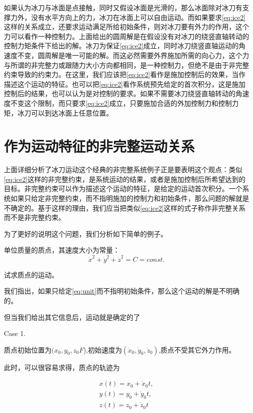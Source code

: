 \documentclass{ctexart}
\begin{document}
如果认为冰刀与冰面是点接触，同时又假设冰面是光滑的，那么冰面除对冰刀有支撑力外，没有水平方向上的力，冰刀在冰面上可以自由运动。而如果要求\eqref{eq:ice2}这样的关系成立，还要求运动满足所给初始条件，则对冰刀要有外力的作用，这个力可以看作一种控制力。上面给出的圆周解是在假设没有对冰刀的绕竖直轴转动的控制力矩条件下给出的解。冰刀为保证\eqref{eq:ice2}成立，同时冰刀绕竖直轴运动的角速度不变，圆周解是唯一可能的解。而这必然需要外界施加所需的向心力，这个力与所谓的非完整力或跟随力大小方向都相同，是一种控制力，但绝不是由于非完整约束导致的约束力。在这里，我们应该把\eqref{eq:ice2}看作是施加控制后的效果，当作描述这个运动的特征。也可以把\eqref{eq:ice2}看作系统预先给定的首次积分，这是施加控制后的结果，也可以认为是对控制的要求。如果不需要冰刀绕竖直轴转动的角速度不变这个限制，而只要求\eqref{eq:ice2}成立，只要施加合适的外加控制力和控制力矩，冰刀可以到达冰面上任意位置。


\section{作为运动特征的非完整运动关系}

上面详细分析了冰刀运动这个经典的非完整系统例子正是要表明这个观点：类似\eqref{eq:ice2}这样的非完整约束，是系统运动的结果，或者是施加控制后所希望达到的目标。非完整约束可以作为描述这个运动的特征，是给定的运动首次积分。一个系统如果只给定非完整约束，而不指明施加的控制力和初始条件，那么问题的解就是不确定的。基于这样的理由，我们应当把类似\eqref{eq:ice2}这样的式子称作非完整关系而不是非完整约束。

为了更好的说明这个问题，我们分析如下简单的例子。

\begin{example}
单位质量的质点，其速度大小为常量：
\begin{equation}
  \label{eq:unit}
  \dot{x}^2+\dot{y}^2+\dot{z}^2 = C = const.
\end{equation}

试求质点的运动。


\end{example}

我们指出，如果只给定\eqref{eq:unit}而不指明初始条件，那么这个运动的解是不明确的。

但当我们给出其它信息后，运动就是确定的了

Case 1.

质点初始位置为$(x_0,y_0,z_0F$),初始速度为$(\dot{x}_0,\dot{y}_0,\dot{z}_0)$,质点不受其它外力作用。

此时，可以很容易求得，质点的轨迹为

\begin{eqnarray}
  \label{eq:unitsol}
  x(t) = x_0 + \dot{x}_0 t,\\
  y(t) = y_0 + \dot{y}_0 t,\\
  z(t) = z_0 + \dot{z}_0 t
\end{eqnarray}
\end{document}
